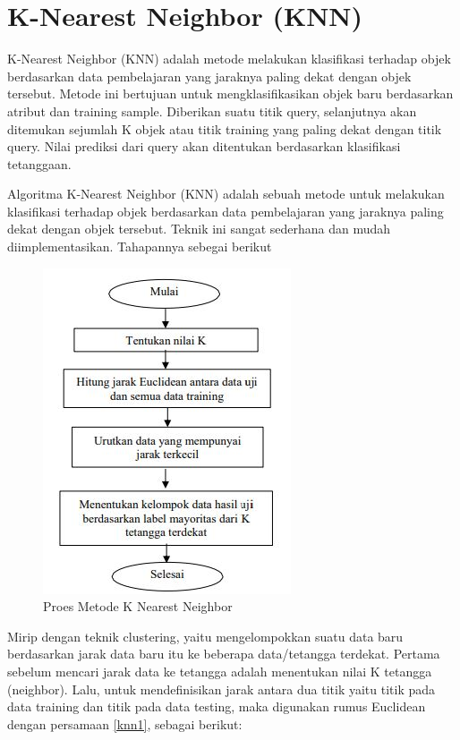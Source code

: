 \section{K-Nearest Neighbor (KNN)}
\par K-Nearest Neighbor (KNN) adalah metode melakukan klasifikasi terhadap objek
berdasarkan data pembelajaran yang jaraknya paling dekat dengan objek tersebut. Metode ini bertujuan untuk mengklasifikasikan objek baru berdasarkan atribut dan training sample.
Diberikan suatu titik query, selanjutnya akan ditemukan sejumlah K objek atau titik training yang paling dekat dengan titik query. Nilai prediksi dari query akan ditentukan berdasarkan klasifikasi tetanggaan. \par 
Algoritma K-Nearest Neighbor (KNN) adalah sebuah metode untuk melakukan klasifikasi terhadap objek berdasarkan data pembelajaran yang jaraknya paling dekat dengan objek tersebut. 
Teknik ini sangat sederhana dan mudah diimplementasikan. Tahapannya sebegai berikut 
\begin{figure}
    \centering
    \includegraphics{chapters/figures/metodeknn.JPG}
    \caption{Proes Metode K Nearest Neighbor}
    \label{fig:my_label}
\end{figure}

Mirip dengan teknik clustering, yaitu mengelompokkan suatu data baru berdasarkan jarak data baru itu ke beberapa data/tetangga terdekat. Pertama sebelum mencari jarak data ke tetangga adalah menentukan nilai K tetangga (neighbor). Lalu, untuk mendefinisikan jarak antara dua titik yaitu titik pada data training dan titik pada data testing, maka digunakan rumus Euclidean dengan persamaan \ref{knn1}, sebagai berikut:

